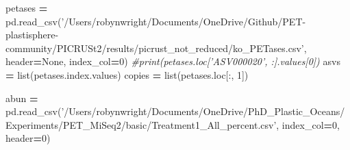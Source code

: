 \documentclass[
]{article}
\newenvironment{Shaded}{\begin{snugshade}}{\end{snugshade}}
\newcommand{\BuiltInTok}[1]{#1}
\newcommand{\CommentTok}[1]{\textcolor[rgb]{0.56,0.35,0.01}{\textit{#1}}}
\newcommand{\DecValTok}[1]{\textcolor[rgb]{0.00,0.00,0.81}{#1}}
\newcommand{\NormalTok}[1]{#1}
\newcommand{\OperatorTok}[1]{\textcolor[rgb]{0.81,0.36,0.00}{\textbf{#1}}}
\newcommand{\StringTok}[1]{\textcolor[rgb]{0.31,0.60,0.02}{#1}}
\newcommand{\VariableTok}[1]{\textcolor[rgb]{0.00,0.00,0.00}{#1}}
\begin{document}
\begin{Shaded}
\begin{Highlighting}[]
\NormalTok{petases }\OperatorTok{=}\NormalTok{ pd.read_csv(}\StringTok{'/Users/robynwright/Documents/OneDrive/Github/PET-plastisphere-community/PICRUSt2/results/picrust_not_reduced/ko_PETases.csv'}\NormalTok{, header}\OperatorTok{=}\VariableTok{None}\NormalTok{, index_col}\OperatorTok{=}\DecValTok{0}\NormalTok{)}
\CommentTok{#print(petases.loc['ASV000020', :].values[0])}
\NormalTok{asvs }\OperatorTok{=} \BuiltInTok{list}\NormalTok{(petases.index.values)}
\NormalTok{copies }\OperatorTok{=} \BuiltInTok{list}\NormalTok{(petases.loc[:, }\DecValTok{1}\NormalTok{])}

\NormalTok{abun }\OperatorTok{=}\NormalTok{ pd.read_csv(}\StringTok{'/Users/robynwright/Documents/OneDrive/PhD_Plastic_Oceans/Experiments/PET_MiSeq2/basic/Treatment1_All_percent.csv'}\NormalTok{, index_col}\OperatorTok{=}\DecValTok{0}\NormalTok{, header}\OperatorTok{=}\DecValTok{0}\NormalTok{)}


\end{Highlighting}
\end{Shaded}
\end{document}
